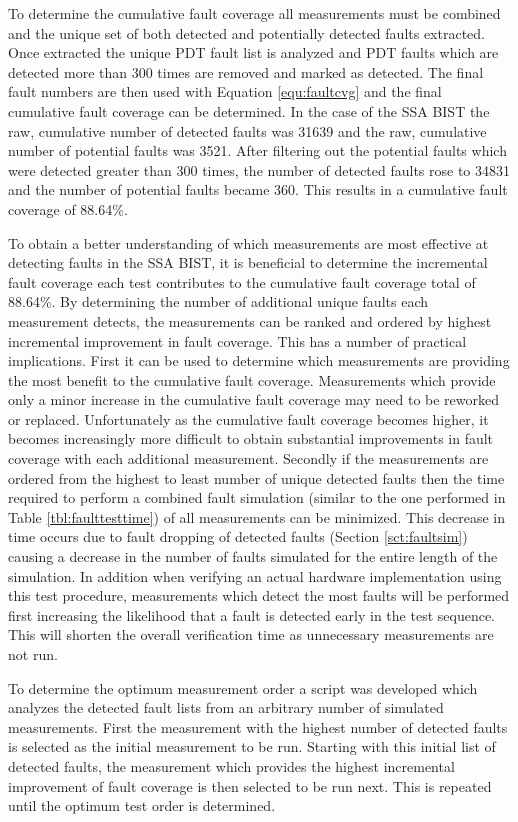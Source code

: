 \documentclass[12pt]{report}
\begin{document}
To determine the cumulative fault coverage all measurements must be combined and the unique set of both detected and potentially detected faults extracted.  Once extracted the unique PDT fault list is analyzed and PDT faults which are detected more than 300 times are removed and marked as detected.  The final fault numbers are then used with Equation \ref{equ:faultcvg} and the final cumulative fault coverage can be determined.  In the case of the SSA BIST the raw, cumulative number of detected faults was 31639 and the raw, cumulative number of potential faults was 3521.  After filtering out the potential faults which were detected greater than 300 times, the number of detected faults rose to 34831 and the number of potential faults became 360.  This results in a cumulative fault coverage of 88.64\%.  

To obtain a better understanding of which measurements are most effective at detecting faults in the SSA BIST, it is beneficial to determine the incremental fault coverage each test contributes to the cumulative fault coverage total of 88.64\%.  By determining the number of additional unique faults each measurement detects, the measurements can be ranked and ordered by highest incremental improvement in fault coverage.  This has a number of practical implications.  First it can be used to determine which measurements are providing the most benefit to the cumulative fault coverage.  Measurements which provide only a minor increase in the cumulative fault coverage may need to be reworked or replaced.  Unfortunately as the cumulative fault coverage becomes higher, it becomes increasingly more difficult to obtain substantial improvements in fault coverage with each additional measurement.  Secondly if the measurements are ordered from the highest to least number of unique detected faults then the time required to perform a combined fault simulation (similar to the one performed in Table \ref{tbl:faulttesttime}) of all measurements can be minimized.  This decrease in time occurs due to fault dropping of detected faults (Section \ref{sct:faultsim}) causing a decrease in the number of faults simulated for the entire length of the simulation.  In addition when verifying an actual hardware implementation using this test procedure, measurements which detect the most faults will be performed first increasing the likelihood that a fault is detected early in the test sequence.  This will shorten the overall verification time as unnecessary measurements are not run.

To determine the optimum measurement order a script was developed which analyzes the detected fault lists from an arbitrary number of simulated measurements.  First the measurement with the highest number of detected faults is selected as the initial measurement to be run.  Starting with this initial list of detected faults, the measurement which provides the highest incremental improvement of fault coverage is then selected to be run next.  This is repeated until the optimum test order is determined.  
\end{document}
